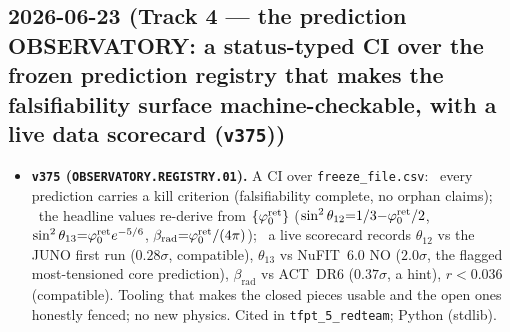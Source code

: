 \subsection*{2026-06-23 (Track 4 --- the prediction OBSERVATORY: a status-typed CI over the frozen prediction registry that makes the falsifiability surface machine-checkable, with a live data scorecard (\texttt{v375}))}
\begin{itemize}
\item \textbf{\texttt{v375} (\texttt{OBSERVATORY.REGISTRY.01}).} A CI over \texttt{freeze\_file.csv}: \mE\ every
prediction carries a kill criterion (falsifiability complete, no orphan claims); \mE\ the headline values
re-derive from $\{\varphi_0^{\mathrm{ret}}\}$ ($\sin^2\theta_{12}{=}1/3{-}\varphi_0^{\mathrm{ret}}/2$, $\sin^2\theta_{13}{=}\varphi_0^{\mathrm{ret}} e^{-5/6}$,
$\beta_{\mathrm{rad}}{=}\varphi_0^{\mathrm{ret}}/(4\pi)$); \mC\ a live scorecard records $\theta_{12}$ vs the JUNO first run
($0.28\sigma$, compatible), $\theta_{13}$ vs NuFIT~6.0 NO ($2.0\sigma$, the flagged most-tensioned core
prediction), $\beta_{\mathrm{rad}}$ vs ACT~DR6 ($0.37\sigma$, a hint), $r<0.036$ (compatible). Tooling that
makes the closed pieces usable and the open ones honestly fenced; no new physics. Cited in
\texttt{tfpt\_5\_redteam}; Python (stdlib).
\end{itemize}

